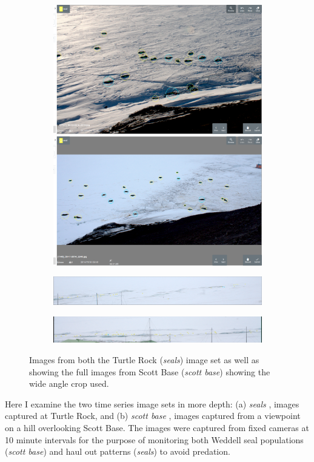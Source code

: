 \begin{figure}[ht!]
\centering
\begin{subfigure}[t]{1.0\linewidth}
  \includegraphics[width=0.475\linewidth]{figures/annotation/screenshots/seals_small2.png}
  \hfill
  \includegraphics[width=0.475\linewidth]{figures/annotation/screenshots/seals_small.png}
  \caption{}
\end{subfigure}

\begin{subfigure}[t]{1.0\linewidth}
  \includegraphics[width=1.0\linewidth]{figures/annotation/screenshots/cam_c.png}
\end{subfigure}

\begin{subfigure}[t]{1.0\linewidth}
  \includegraphics[width=1.0\linewidth]{figures/annotation/screenshots/cam_b.png}
  \caption{}
\end{subfigure}


\caption{ Images from both the Turtle Rock (\emph{seals}) image set as well as showing the full images from Scott Base (\emph{scott base}) showing the wide angle crop used.  }
\label {fig:weddell_images}
\end{figure}


Here I examine the two time series image sets in more depth: (a) \emph{seals}  \cite{Eisert2015}, images captured at Turtle Rock, and (b) \emph{scott base}  \cite{Eisert2019}, images captured from a viewpoint on a hill overlooking Scott Base. The images were captured from fixed cameras at 10 minute intervals for the purpose of monitoring both Weddell seal populations (\emph{scott base}) and haul out patterns (\emph{seals}) to avoid predation. 



